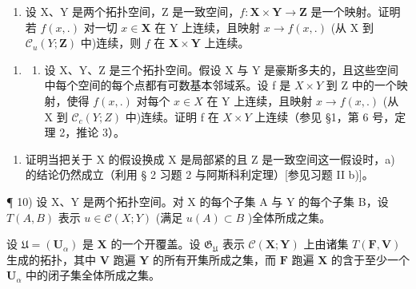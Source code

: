 \begin{enumerate}
\def\labelenumi{\alph{enumi})}
\setcounter{enumi}{1}
\tightlist
\item
  设 X、Y 是两个拓扑空间，Z 是一致空间，\(f: \mathbf{X} \times \mathbf{Y} \to \mathbf{Z}\) 是一个映射。证明若 \(f(x, .)\) 对一切 \(x \in \mathbf{X}\) 在 Y 上连续，且映射 \(x \to f(x, .)\) (从 X 到 \(\mathcal{C}_u(Y; \mathbf{Z})\) 中)连续，则 \(f\) 在 \(\mathbf{X} \times \mathbf{Y}\) 上连续。
\end{enumerate}

\begin{enumerate}
\def\labelenumi{\arabic{enumi})}
\setcounter{enumi}{8}
\tightlist
\item
  \begin{enumerate}
  \def\labelenumii{\alph{enumii})}
  \tightlist
  \item
    设 X、Y、Z 是三个拓扑空间。假设 X 与 Y 是豪斯多夫的，且这些空间中每个空间的每个点都有可数基本邻域系。设 f 是 \(X \times Y\) 到 Z 中的一个映射，使得 \(f(x, .)\) 对每个 \(x \in X\) 在 Y 上连续，且映射 \(x \to f(x, .)\) (从 X 到 \(\mathcal{C}_{c}(Y; Z)\) 中)连续。证明 f 在 \(X \times Y\) 上连续（参见 §1，第 6 号，定理 2，推论 3）。
  \end{enumerate}
\end{enumerate}

\begin{enumerate}
\def\labelenumi{\alph{enumi})}
\setcounter{enumi}{1}
\tightlist
\item
  证明当把关于 X 的假设换成 X 是局部紧的且 Z 是一致空间这一假设时，a) 的结论仍然成立（利用 § 2 习题 2 与阿斯科利定理）{[}参见习题 II b){]}。
\end{enumerate}

¶ 10) 设 X、Y 是两个拓扑空间。对 X 的每个子集 A 与 Y 的每个子集 B，设 \(T(A, B)\) 表示 \(u \in \mathcal{C}(X; Y)\) (满足 \(u(A) \subset B\) )全体所成之集。

设 \(\mathfrak{U} = (\mathbf{U}_{\alpha})\) 是 \(\mathbf{X}\) 的一个开覆盖。设 \(\mathfrak{G}_{\mathfrak{U}}\) 表示 \(\mathcal{C}(\mathbf{X};\mathbf{Y})\) 上由诸集 \(T(\mathbf{F},\mathbf{V})\) 生成的拓扑，其中 \(\mathbf{V}\) 跑遍 \(\mathbf{Y}\) 的所有开集所成之集，而 \(\mathbf{F}\) 跑遍 \(\mathbf{X}\) 的含于至少一个 \(\mathbf{U}_{\alpha}\) 中的闭子集全体所成之集。

